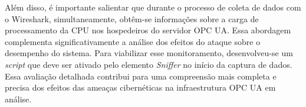 
    Além disso, é importante salientar que durante o processo de coleta de dados com o Wireshark, simultaneamente, obtêm-se informações sobre a carga de processamento da CPU nos hospedeiros do servidor OPC UA. Essa abordagem complementa significativamente a análise dos efeitos do ataque sobre o desempenho do sistema. Para viabilizar esse monitoramento, desenvolveu-se um \textit{script} que deve ser ativado pelo elemento \textit{Sniffer} no início da captura de dados. Essa avaliação detalhada contribui para uma compreensão mais completa e precisa dos efeitos das ameaças cibernéticas na infraestrutura OPC UA em análise.

